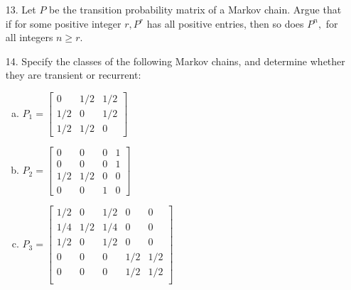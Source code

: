 \documentclass{article}
\begin{document}
\begin{itemize}
\begin{proof}
\begin{align*}
				&= \frac{p}{2} + \frac{p}{2}(2p-1)^k + \frac{1}{2} - \frac{1}{2}(2p-1)^k - \frac{p}{2} + \frac{p}{2}(2p-1)^k \\
				&= \frac{1}{2} + \left( p-\frac{1}{2} \right)(2p-1)^k = \frac{1}{2} + \frac{1}{2}(2p-1)^{k+1} \\
				P_{01}=P_{10} &= (1-p)\left( \frac{1}{2}+\frac{1}{2}(2p-1)^k \right) + p\left( \frac{1}{2}-\frac{1}{2}(2p-1)^k \right) \\
				&= \frac{1}{2}+\frac{1}{2}(2p-1)^k - \frac{p}{2} + \frac{p}{2}(2p-1)^k + \frac{p}{2} - \frac{p}{2}(2p-1)^k \\
				&= \frac{1}{2} - \left( p-\frac{1}{2} \right)(2p-1)^k = \frac{1}{2}-\frac{1}{2}(2p-1)^k
			\end{align*}
			so the formula holds for $k+1,$ and the statement is proven.
		\end{proof}

	\item[13.] Let $P$ be the transition probability matrix of a Markov chain. Argue that if for some positive integer $r, P^r$ has all positive entries, then so does $P^n,$ for all integers $n\ge r.$

	\item[14.] Specify the classes of the following Markov chains, and determine whether they are transient or recurrent:
		\begin{enumerate}[(a)]
			\item $P_1=\begin{bmatrix}
					0 & 1/2 & 1/2 \\ 1/2 & 0 & 1/2 \\ 1/2 & 1/2 & 0
				\end{bmatrix}$

			\item $P_2=\begin{bmatrix}
					0 & 0 & 0 & 1 \\ 0 & 0 & 0 & 1 \\ 1/2 & 1/2 & 0 & 0 \\ 0 & 0 & 1 & 0
				\end{bmatrix}$

			\item $P_3=\begin{bmatrix}
					1/2 & 0 & 1/2 & 0 & 0 \\
					1/4 & 1/2 & 1/4 & 0 & 0 \\
					1/2 & 0 & 1/2 & 0 & 0 \\
					0 & 0 & 0 & 1/2 & 1/2 \\
					0 & 0 & 0 & 1/2 & 1/2 \\
				\end{bmatrix}$


\end{enumerate}
\end{itemize}
\end{document}
